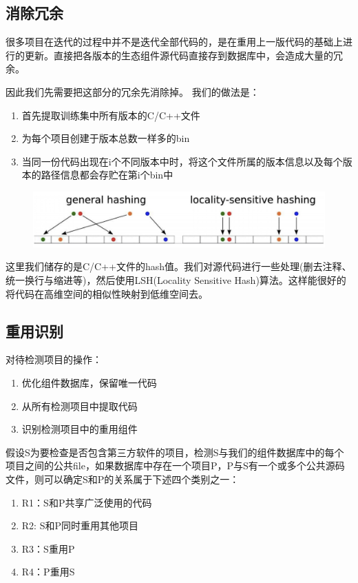 \documentclass{cjc}
\begin{document}
\subsection{消除冗余}
很多项目在迭代的过程中并不是迭代全部代码的，是在重用上一版代码的基础上进行的更新。直接把各版本的生态组件源代码直接存到数据库中，会造成大量的冗余。

因此我们先需要把这部分的冗余先消除掉。
我们的做法是：
\begin{enumerate}
\item 首先提取训练集中所有版本的C/C++文件
\item 为每个项目创建于版本总数一样多的bin
\item 当同一份代码出现在i个不同版本中时，将这个文件所属的版本信息以及每个版本的路径信息都会存贮在第i个bin中
\end{enumerate}

\begin{figure}[htb]
  \centering
  \includegraphics[width=\linewidth]{pics/LSH.png}
\end{figure}

这里我们储存的是C/C++文件的hash值。我们对源代码进行一些处理(删去注释、统一换行与缩进等)，然后使用LSH(Locality Sensitive Hash)算法。这样能很好的将代码在高维空间的相似性映射到低维空间去。

\subsection{重用识别}

对待检测项目的操作：
\begin{enumerate}
    \item 优化组件数据库，保留唯一代码
    \item 从所有检测项目中提取代码
    \item 识别检测项目中的重用组件
\end{enumerate}

假设S为要检查是否包含第三方软件的项目，检测S与我们的组件数据库中的每个项目之间的公共file，如果数据库中存在一个项目P，P与S有一个或多个公共源码文件，则可以确定S和P的关系属于下述四个类别之一：

\begin{enumerate}
    \item R1：S和P共享广泛使用的代码
    \item R2: S和P同时重用其他项目
    \item R3：S重用P
    \item R4：P重用S
\end{enumerate}
\end{document}
